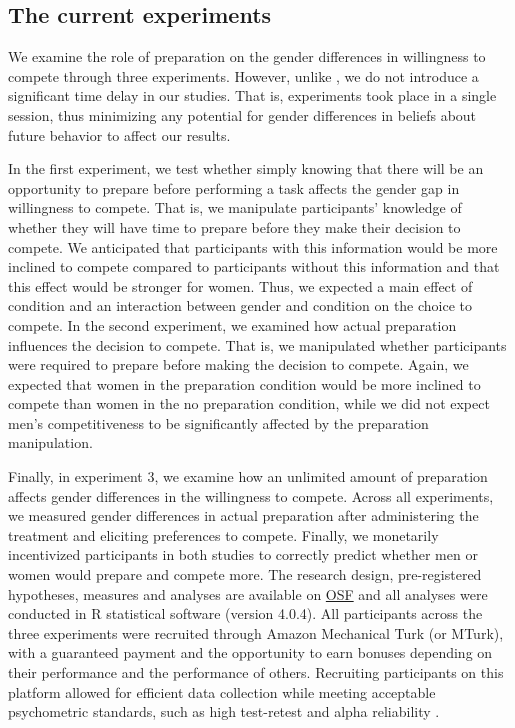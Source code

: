\documentclass[letterpaper, nobind]{templates/ociamthesis}
\begin{document}
\hypertarget{the-current-experiments}{%
\subsection{The current experiments}\label{the-current-experiments}}

We examine the role of preparation on the gender differences in willingness to compete through three experiments. However, unlike \textcite{Charness2021}, we do not introduce a significant time delay in our studies. That is, experiments took place in a single session, thus minimizing any potential for gender differences in beliefs about future behavior to affect our results.

In the first experiment, we test whether simply knowing that there will be an opportunity to prepare before performing a task affects the gender gap in willingness to compete. That is, we manipulate participants' knowledge of whether they will have time to prepare before they make their decision to compete. We anticipated that participants with this information would be more inclined to compete compared to participants without this information and that this effect would be stronger for women. Thus, we expected a main effect of condition and an interaction between gender and condition on the choice to compete. In the second experiment, we examined how actual preparation influences the decision to compete. That is, we manipulated whether participants were required to prepare before making the decision to compete. Again, we expected that women in the preparation condition would be more inclined to compete than women in the no preparation condition, while we did not expect men's competitiveness to be significantly affected by the preparation manipulation.

Finally, in experiment 3, we examine how an unlimited amount of preparation affects gender differences in the willingness to compete. Across all experiments, we measured gender differences in actual preparation after administering the treatment and eliciting preferences to compete. Finally, we monetarily incentivized participants in both studies to correctly predict whether men or women would prepare and compete more. The research design, pre-registered hypotheses, measures and analyses are available on \href{https://osf.io/q39a5/}{OSF} and all analyses were conducted in R statistical software (version 4.0.4). All participants across the three experiments were recruited through Amazon Mechanical Turk (or MTurk), with a guaranteed payment and the opportunity to earn bonuses depending on their performance and the performance of others. Recruiting participants on this platform allowed for efficient data collection while meeting acceptable psychometric standards, such as high test-retest and alpha reliability \autocite{Rand2012,Buhrmester2011,Paolacci2014,Chandler2016}.
\end{document}
